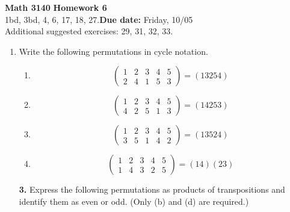 \documentclass[12pt,reqno]{amsart}
\newcommand{\probskip}{\vskip1cm}
\begin{document}
\thispagestyle{empty}

\noindent \textbf{Math 3140} \hfill {\bf Homework 6}\\[4pt]
   1bd, 3bd, 4, 6, 17, 18, 27.\hfill {\bf Due date:} Friday, 10/05\\  
   Additional suggested exercises: 29, 31, 32, 33.  \\


\medskip


\begin{enumerate}[{\bf 1.}]

\item %
Write the following permutations in cycle notation.
\begin{multicols}{2}
\begin{enumerate}
 
\item
\[
\begin{pmatrix}
1 & 2 & 3 & 4 & 5 \\
2 & 4 & 1 & 5 & 3
\end{pmatrix}
=(13254)
\]

\item
\[
\begin{pmatrix}
1 & 2 & 3 & 4 & 5 \\
4 & 2 & 5 & 1 & 3
\end{pmatrix}
=(14253)
\]

\item
\[
\begin{pmatrix}
1 & 2 & 3 & 4 & 5 \\
3 & 5 & 1 & 4 & 2
\end{pmatrix}
=(13524)
\]

\item
\[
\begin{pmatrix}
1 & 2 & 3 & 4 & 5 \\
1 & 4 & 3 & 2 & 5
\end{pmatrix}
=(14)(23)
\]

\end{enumerate}
\end{multicols}

\probskip
 
\item[{\bf 3.}] 
Express the following permutations as products of transpositions and
identify them as even or odd.  (Only (b) and (d) are required.)
\begin{multicols}{2}
\begin{enumerate}
 

\end{enumerate}
\end{multicols}
\end{enumerate}
\end{document}
